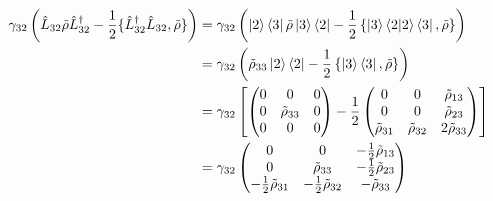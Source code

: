\begin{equation}
\begin{split}
    \gamma_{32} \left( \hat{L}_{32} \tilde{\rho} \hat{L}_{32}^{\dagger} - \frac{1}{2} \{\hat{L}_{32}^{\dagger} \hat{L}_{32}, \tilde{\rho}\} \right) &= \gamma_{32} \left(\ket{2}\bra{3}\tilde{\rho} \ket{3} \bra{2} - \frac{1}{2}  \left\{\ket{3} \bra{2}\ket{2}\bra{3} , \tilde{\rho}\right\} \right) \\
    &= \gamma_{32} \left(\tilde{\rho}_{33} \ket{2}\bra{2} - \frac{1}{2}  \left\{\ket{3}\bra{3},\tilde{\rho}\right\} \right) \\
    &= \gamma_{32} \left[ \begin{pmatrix}
        0 & 0 &  0\\
        0 & \tilde{\rho}_{33} & 0 \\
        0 & 0 & 0 \\
    \end{pmatrix}
    - \frac{1}{2} \begin{pmatrix}
        0 & 0 & \tilde{\rho}_{13} \\
        0 & 0 & \tilde{\rho}_{23} \\
        \tilde{\rho}_{31} & \tilde{\rho}_{32} & 2 \tilde{\rho}_{33} \\
    \end{pmatrix} \right] \\
    &= \gamma_{32} \begin{pmatrix}
        0 & 0 &  - \frac{1}{2} \tilde{\rho}_{13} \\
        0 & \tilde{\rho}_{33} &  - \frac{1}{2} \tilde{\rho}_{23} \\
         - \frac{1}{2}  \tilde{\rho}_{31} &   - \frac{1}{2} \tilde{\rho}_{32} &  - \tilde{\rho}_{33} \\
    \end{pmatrix} 
\end{split}
\end{equation}
